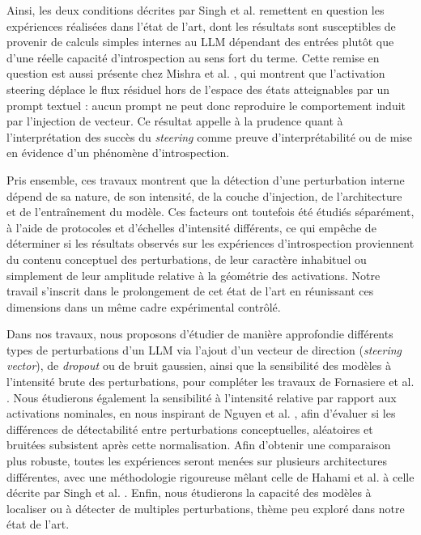 \documentclass[10pt,a4paper]{article}
\begin{document}
Ainsi, les deux conditions décrites par Singh et al. \cite{singh2026} remettent en question les expériences réalisées dans l'état de l'art, dont les résultats sont susceptibles de provenir de calculs simples internes au LLM dépendant des entrées plutôt que d'une réelle capacité d'introspection au sens fort du terme. Cette remise en question est aussi présente chez Mishra et al. \cite{mishra2026}, qui montrent que l'activation steering déplace le flux résiduel hors de l'espace des états atteignables par un prompt textuel : aucun prompt ne peut donc reproduire le comportement induit par l'injection de vecteur. Ce résultat appelle à la prudence quant à l'interprétation des succès du \emph{steering} comme preuve d'interprétabilité ou de mise en évidence d'un phénomène d'introspection.

Pris ensemble, ces travaux montrent que la détection d'une perturbation interne dépend de sa nature, de son intensité, de la couche d'injection, de l'architecture et de l'entraînement du modèle. Ces facteurs ont toutefois été étudiés séparément, à l'aide de protocoles et d'échelles d'intensité différents, ce qui empêche de déterminer si les résultats observés sur les expériences d'introspection proviennent du contenu conceptuel des perturbations, de leur caractère inhabituel ou simplement de leur amplitude relative à la géométrie des activations. Notre travail s'inscrit dans le prolongement de cet état de l'art en réunissant ces dimensions dans un même cadre expérimental contrôlé.

Dans nos travaux, nous proposons d'étudier de manière approfondie différents types de perturbations d'un LLM via l'ajout d'un vecteur de direction (\emph{steering vector}), de \emph{dropout} ou de bruit gaussien, ainsi que la sensibilité des modèles à l'intensité brute des perturbations, pour compléter les travaux de Fornasiere et al. \cite{fornasiere2026}. Nous étudierons également la sensibilité à l'intensité relative par rapport aux activations nominales, en nous inspirant de Nguyen et al. \cite{nguyen2026}, afin d'évaluer si les différences de détectabilité entre perturbations conceptuelles, aléatoires et bruitées subsistent après cette normalisation. Afin d'obtenir une comparaison plus robuste, toutes les expériences seront menées sur plusieurs architectures différentes, avec une méthodologie rigoureuse mêlant celle de Hahami et al. \cite{hahami2026} à celle décrite par Singh et al. \cite{singh2026}. Enfin, nous étudierons la capacité des modèles à localiser ou à détecter de multiples perturbations, thème peu exploré dans notre état de l'art.
\end{document}
